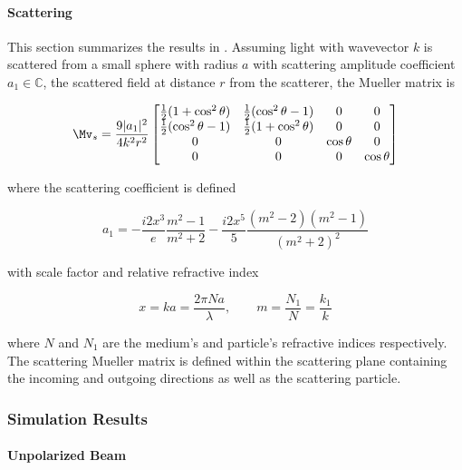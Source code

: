 \paragraph{Scattering}
This section summarizes the results in \cite{bohren2008absorption}. Assuming light with wavevector $k$ is scattered from a small sphere with radius $a$ with scattering amplitude coefficient $a_1 \in \mathbb{C}$, the scattered field at distance $r$ from the scatterer, the Mueller matrix is

\begin{equation}
    \Mv_s = \frac{9|a_1|^2}{4k^2r^2}
    \begin{bmatrix}
        \tfrac{1}{2}(1 + \cos^2{\theta}) & \tfrac{1}{2}(\cos^2{\theta} - 1) & 0 & 0 \\
        \tfrac{1}{2}(\cos^2{\theta} - 1) & \tfrac{1}{2}(1 + \cos^2{\theta}) & 0 & 0 \\
        0 & 0 & \cos{\theta} & 0 \\ 
        0 & 0 & 0 & \cos{\theta}
    \end{bmatrix}
\end{equation}

where the scattering coefficient is defined

\begin{equation}
    a_1 = -\frac{i2x^3}{e} \frac{m^2 - 1}{m^2 + 2} - \frac{i2x^5}{5} \frac{(m^2 - 2)(m^2 - 1)}{(m^2 + 2)^2}
\end{equation}

with scale factor and relative refractive index

\begin{equation}
    x = ka = \frac{2 \pi N a}{\lambda},  \qquad m = \frac{N_1}{N} = \frac{k_1}{k}
\end{equation}

where $N$ and $N_1$ are the medium's and particle's refractive indices respectively. The scattering Mueller matrix is defined within the scattering plane containing the incoming and outgoing directions as well as the scattering particle.

\subsubsection{Simulation Results}

\paragraph{Unpolarized Beam}

